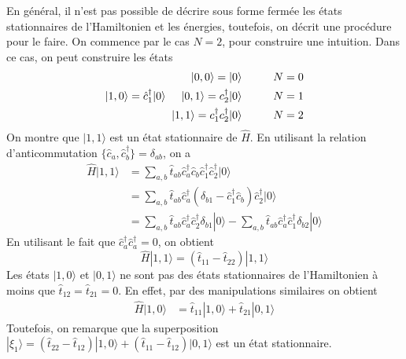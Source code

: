 \documentclass{article}
\numberwithin{equation}{section}
\theoremstyle{solution}
\begin{document}
En général, il n'est pas possible de décrire sous forme fermée les états stationnaires de l'Hamiltonien et les énergies, 
toutefois, on décrit une procédure pour le faire. 
On commence par le cas $N=2$, pour construire une intuition. Dans ce cas, on peut construire les états
\begin{align*}
        | 0, 0 \rangle  = | 0 \rangle \hspace{1cm} N = 0 \\
        | 1, 0 \rangle = \hat{c}_1^{\dagger}| 0 \rangle   \hspace{.5cm} | 0, 1 \rangle = c_2^{\dagger}| 0 \rangle  \hspace{1cm} N = 1 \\
        | 1, 1 \rangle = c_1^{\dagger}c_2^{\dagger}| 0 \rangle  \hspace{1cm} N = 2
\end{align*}
On montre que $| 1, 1 \rangle $ est un état stationnaire de $\hat{H}$.
En utilisant la relation d'anticommutation $\{\hat{c}_a, \hat{c}_b^{\dagger}\} = \delta_{ab}$, on a
\begin{align*}
       \hat{H}| 1, 1 \rangle  &= \sum_{a, b} \hat{t}_{ab}\hat{c}^{\dagger}_a \hat{c}_b \hat{c}_1^{\dagger}\hat{c}_2^{\dagger} | 0 \rangle  \\
                        &= \sum_{a, b} \hat{t}_{ab} \hat{c}^{\dagger}_a(\delta_{b1} - \hat{c}_1^{\dagger} \hat{c}_b)\hat{c}^{\dagger}_2 | 0 \rangle  \\
                        &= \sum_{a, b} \hat{t}_{ab} \hat{c}^{\dagger}_{a}\hat{c}^{\dagger}_2\delta_{b1}| 0 \rangle  - \sum_{a,b}\hat{t}_{ab}\hat{c}^{\dagger}_a\hat{c}^{\dagger}_1 \delta_{b2} | 0 \rangle 
\end{align*}
En utilisant le fait que $\hat{c}_{a}^{\dagger}\hat{c}_a^{\dagger} = 0$, on obtient
\begin{equation}
        \hat{H}| 1, 1 \rangle =  (\hat{t}_{11}  - \hat{t}_{22})| 1, 1 \rangle 
\end{equation} 
Les états $| 1, 0 \rangle $ et $| 0, 1 \rangle $ ne sont pas des états stationnaires de l'Hamiltonien à moins que $\hat{t}_{12} = \hat{t}_{21}= 0$. En effet, 
par des manipulations similaires on obtient
\begin{align*}
        \hat{H} | 1, 0 \rangle &= \hat{t}_{11} |1, 0  \rangle + \hat{t}_{21}| 0, 1 \rangle 
\end{align*}
Toutefois, on remarque que la superposition $| \xi_1 \rangle  = (\hat{t}_{22} - \hat{t}_{12})| 1, 0 \rangle + (\hat{t}_{11} - \hat{t}_{12})| 0, 1 \rangle$ est un état stationnaire. 
\end{document}
